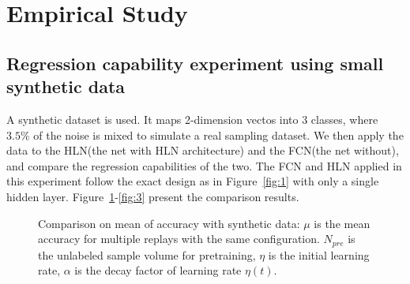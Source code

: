 \documentclass[3p,times,procedia]{elsarticle}
\begin{document}
\section{Empirical Study}
\subsection{Regression capability
experiment using small synthetic data}
A synthetic dataset is used. It maps
2-dimension vectos into 3 classes, where
$3.5\%$ of the noise is mixed to simulate 
a real sampling dataset.
We then apply the data to the HLN(the 
net with HLN architecture) and the 
FCN(the net without),
and compare the regression capabilities 
of the two. 
The FCN and HLN applied in this 
experiment follow the exact design as 
in Figure~\ref{fig:1} with only a single 
hidden layer.
Figure~\ref{fig:2}-\ref{fig:3} 
present the comparison results.

\begin{figure}[h]
	\centering
	\hspace{-8mm}
	\hspace{-8mm}
	\caption{
		Comparison on mean of 
		accuracy with synthetic data:
		$\mu$ is the mean accuracy for
		multiple replays with the same
		configuration.
		$N_{pre}$ is the unlabeled sample 
		volume for pretraining, $\eta$
		is the initial learning rate,
		$\alpha$ is the decay factor of
		learning rate $\eta(t)$.
		}
	\label{fig:2}
\end{figure}
\end{document}
